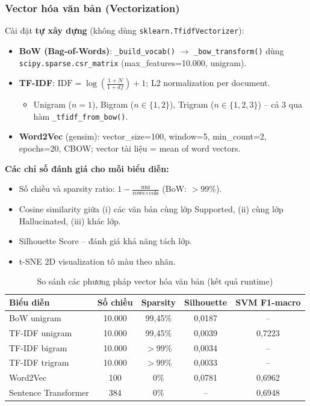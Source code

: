 \documentclass[12pt,a4paper]{article}
\let\oldtextbf\textbf
\renewcommand{\textbf}[1]{\oldtextbf{\textcolor{hcmublue}{#1}}}
\begin{document}
\subsubsection{Vector hóa văn bản (Vectorization)}

Cài đặt \textbf{tự xây dựng} (không dùng \texttt{sklearn.TfidfVectorizer}):

\begin{itemize}
    \item \textbf{BoW (Bag-of-Words)}: \texttt{\_build\_vocab()} $\rightarrow$ \texttt{\_bow\_transform()} dùng \texttt{scipy.sparse.csr\_matrix} (max\_features=10.000, unigram).
    \item \textbf{TF-IDF}: $\text{IDF} = \log\!\left(\frac{1+N}{1+df}\right) + 1$; L2 normalization per document.
        \begin{itemize}
            \item Unigram ($n=1$), Bigram ($n \in \{1,2\}$), Trigram ($n \in \{1,2,3\}$) -- cả 3 qua hàm \texttt{\_tfidf\_from\_bow()}.
        \end{itemize}
    \item \textbf{Word2Vec} (gensim): vector\_size=100, window=5, min\_count=2, epochs=20, CBOW; vector tài liệu = mean of word vectors.
\end{itemize}

\textbf{Các chỉ số đánh giá cho mỗi biểu diễn:}
\begin{itemize}
    \item Số chiều và sparsity ratio: $1 - \frac{\text{nnz}}{\text{rows} \times \text{cols}}$ (BoW: $> 99\%$).
    \item Cosine similarity giữa (i) các văn bản cùng lớp Supported, (ii) cùng lớp Hallucinated, (iii) khác lớp.
    \item Silhouette Score -- đánh giá khả năng tách lớp.
    \item t-SNE 2D visualization tô màu theo nhãn.
\end{itemize}

\begin{table}[H]
\centering
\begin{tabular}{|l|c|c|c|c|}
\hline
\textbf{Biểu diễn} & \textbf{Số chiều} & \textbf{Sparsity} & \textbf{Silhouette} & \textbf{SVM F1-macro} \\ \hline
BoW unigram     & 10.000 & 99{,}45\% & 0{,}0187 & -- \\ \hline
TF-IDF unigram  & 10.000 & 99{,}45\% & 0{,}0039 & 0{,}7223 \\ \hline
TF-IDF bigram   & 10.000 & $>$99\%   & 0{,}0034 & -- \\ \hline
TF-IDF trigram  & 10.000 & $>$99\%   & 0{,}0033 & -- \\ \hline
Word2Vec        & 100    & 0\%       & 0{,}0781 & 0{,}6962 \\ \hline
Sentence Transformer & 384 & 0\%    & -- & 0{,}6948 \\ \hline
\end{tabular}
\caption{So sánh các phương pháp vector hóa văn bản (kết quả runtime)}
\label{tab:vectorization}
\end{table}
\end{document}
